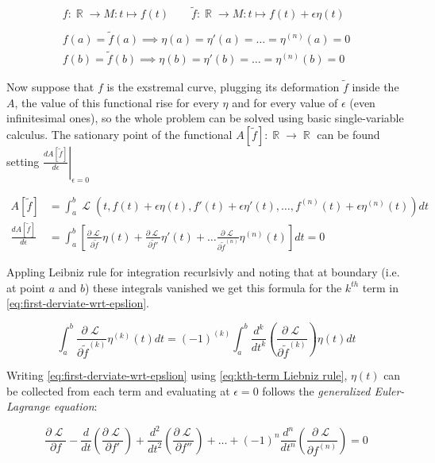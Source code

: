 \documentclass[a4paper]{article}
\DeclareMathOperator{\Lagr}{\mathcal{L}} %
\DeclareMathOperator{\R}{\mathbb{R}} %
\begin{document}
  \begin{gather*}
    f:  \R \rightarrow M: t \mapsto f(t) \qquad
    \tilde{f} : \R \rightarrow M: t \mapsto f(t) + \epsilon\eta(t) \\ \\
    f(a) = \tilde{f}(a) \implies \eta(a) = \eta'(a) = \ldots = \eta^{(n)}(a) = 0 \\
    f(b) = \tilde{f}(b) \implies \eta(b) = \eta'(b) = \ldots = \eta^{(n)}(b) = 0
  \end{gather*}

  Now suppose that $f$ is the exstremal curve, plugging its deformation
  $\tilde{f}$ inside the $A$, the value of this functional rise for every
  $\eta$ and for every value of $\epsilon$ (even infinitesimal ones), so the
  whole problem can be solved using basic single-variable calculus.
  The sationary point of the functional $A[\tilde{f}]: \R \rightarrow \R$
  can be found setting
  $\left. \frac{dA[\tilde{f}]}{d\epsilon} \right \rvert_{\epsilon=0}$

  \begin{align}
    A[\tilde{f}] &=
    \int_{a}^{b} \Lagr(t, f(t) + \epsilon\eta(t), f'(t) + \epsilon\eta'(t),
    \ldots, f^{(n)}(t) + \epsilon\eta^{(n)}(t)) dt \\
    \frac{dA[\tilde{f}]}{d\epsilon} &= \int_{a}^{b} \left[
    \frac{\partial\Lagr}{\partial\tilde{f}}\eta(t) +
    \frac{\partial\Lagr}{\partial\tilde{f}'}\eta'(t) + \ldots
    \frac{\partial\Lagr}{\partial\tilde{f}^{(n)}}\eta^{(n)}(t) \right] dt = 0
    \label{eq:first-derviate-wrt-epslion}
  \end{align}

  Appling Leibniz rule for integration recurlsivly and noting that at boundary
  (i.e. at point $a$ and $b$) these integrals vanished we get this formula for
  the $k^{th}$ term in \eqref{eq:first-derviate-wrt-epslion}.

  \begin{equation} \label{eq:kth-term Liebniz rule}
    \int_{a}^{b} \frac{\partial\Lagr}{\partial\tilde{f}^{(k)}}\eta^{(k)}(t) dt
    = (-1)^{(k)}\int_{a}^{b} \frac{d^k}{dt^k}\left(
    \frac{\partial\Lagr}{\partial\tilde{f}^{(k)}}\right)\eta(t) dt
  \end{equation}

  Writing \eqref{eq:first-derviate-wrt-epslion} using \eqref{eq:kth-term Liebniz
  rule}, $\eta(t)$ can be collected from each term and evaluating at $\epsilon=0$
  follows the \emph{generalized Euler-Lagrange equation}:

  \begin{equation} \label{eq:Euler-Lagrange eq generalized}
      \frac{\partial\Lagr}{\partial f}
    - \frac{d}{dt}\left(\frac{\partial\Lagr}{\partial f'}\right)
    + \frac{d^2}{dt^2}\left(\frac{\partial\Lagr}{\partial f''}\right)
    + \ldots
    + (-1)^n \frac{d^n}{dt^n}\left(\frac{\partial\Lagr}{\partial f^{(n)}}\right)
    = 0
  \end{equation}
\end{document}
